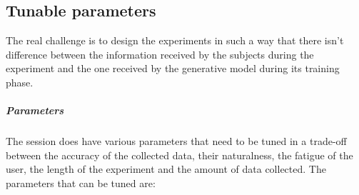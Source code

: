 \documentclass[12pt]{report}
\begin{document}
\subsection{Tunable parameters}
The real challenge is to design the experiments in such a way that there isn't difference between the information received by the subjects during the experiment and the one received by the generative model during its training phase.  

\subparagraph{Parameters}
The session does have various parameters that need to be tuned in a trade-off between the accuracy of the collected data, their naturalness, the fatigue of the user, the length of the experiment and the amount of data collected. The parameters that can be tuned are:
\end{document}
